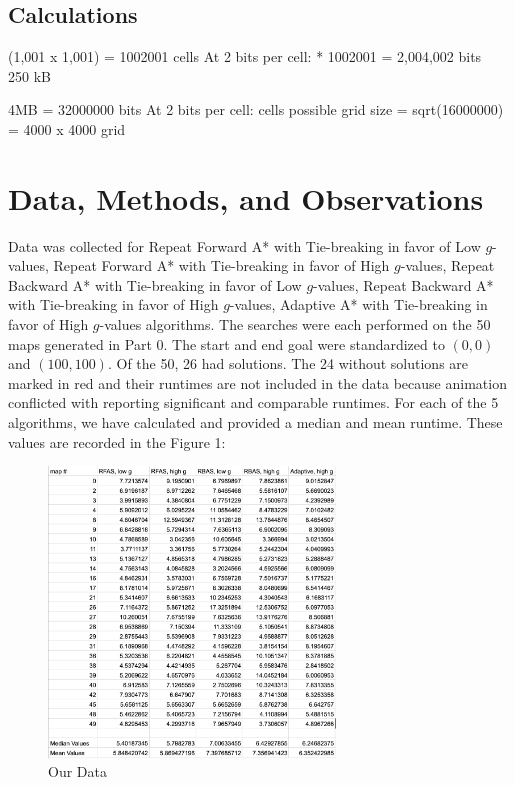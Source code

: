 \documentclass[a4paper,12pt]{article}
\begin{document}
\subsection{Calculations}
(1,001 x 1,001) = 1002001 cells \newline
At 2 bits per cell:  * 1002001  = 2,004,002 bits ~ 250 kB \newline \newline

4MB = 32000000 bits \newline
At 2 bits per cell:  cells possible \newline 
	grid size = sqrt(16000000) = 4000 x 4000 grid

\section{Data, Methods, and Observations}

Data was collected for Repeat Forward A* with Tie-breaking in favor of Low $g$-values, Repeat Forward A* with Tie-breaking in favor of High $g$-values,  Repeat Backward A* with Tie-breaking in favor of Low $g$-values, Repeat Backward A* with Tie-breaking in favor of High $g$-values, Adaptive A* with Tie-breaking in favor of High $g$-values algorithms. The searches were each performed on the 50 maps generated in Part 0. The start and end goal were standardized to $(0,0)$ and $(100,100)$. Of the 50, 26 had solutions. The 24 without solutions are marked in red and their runtimes are not included in the data because animation conflicted with reporting significant and comparable runtimes. For each of the 5 algorithms, we have calculated and provided a median and mean runtime. These values are recorded in the Figure 1:

\begin{figure}[!htbp]
	\includegraphics[angle=0, origin=c, width =  0.68\textwidth]{data1.jpg}
	\caption{Our Data}
\end{figure}
\FloatBarrier
\end{document}
